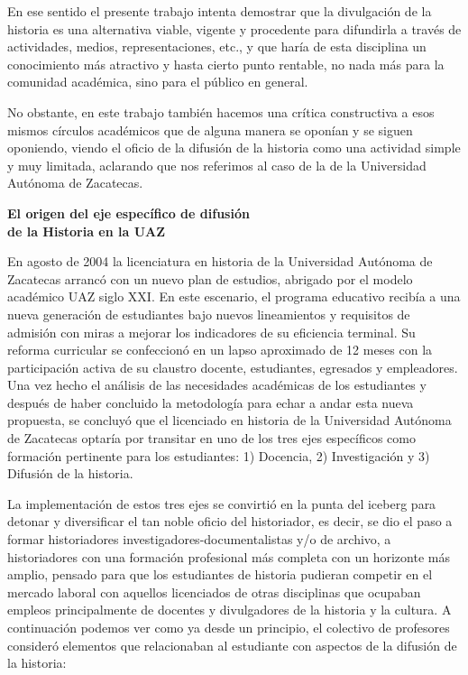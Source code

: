 En ese sentido el presente trabajo intenta demostrar que la divulgación de la
historia es una alternativa viable, vigente y procedente para difundirla a
través de actividades, medios, representaciones, etc., y que haría de esta
disciplina un conocimiento más atractivo y hasta cierto punto rentable, no
nada más para la comunidad académica, sino para el público en general.


No obstante, en este trabajo también hacemos una crítica constructiva a esos
mismos círculos académicos que de alguna manera se oponían y se siguen
oponiendo, viendo el oficio de la difusión de la historia como una actividad
simple y muy limitada, aclarando que nos referimos al caso de la  de la
Universidad Autónoma de Zacatecas.


\bigskip
\textbf{El origen del eje específico de difusión\\ de la Historia en la UAZ}

En agosto de 2004 la licenciatura en historia de la Universidad Autónoma de
Zacatecas arrancó con un nuevo plan de estudios, abrigado por el modelo
académico UAZ siglo XXI\@. En este escenario, el programa educativo recibía a una nueva generación de estudiantes bajo nuevos lineamientos y requisitos de
admisión con miras a mejorar los indicadores de su eficiencia terminal. Su
reforma curricular se confeccionó en un lapso aproximado de 12 meses con la
participación activa de su claustro docente, estudiantes, egresados y
empleadores. Una vez hecho el análisis de las necesidades académicas de los
estudiantes y después de haber concluido la metodología para echar a andar esta
nueva propuesta, se concluyó que el licenciado en historia de la Universidad
Autónoma de Zacatecas optaría por transitar en uno de los tres ejes específicos
como formación pertinente para los estudiantes: 1) Docencia, 2) Investigación y
3) Difusión de la historia. 

La implementación de estos tres ejes se convirtió en la punta del iceberg
para detonar y diversificar el tan noble oficio del historiador, es decir, se
dio el paso a formar historiadores in\-ves\-ti\-ga\-do\-res-do\-cu\-men\-ta\-lis\-tas y\slash{}o de archivo, a historiadores con una formación profesional más completa con un
horizonte más amplio, pensado para que los estudiantes de historia pudieran
competir en el mercado laboral con aquellos licenciados de otras disciplinas
que ocupaban empleos principalmente de docentes y divulgadores de la historia y
la cultura. A continuación podemos ver como ya desde un principio, el colectivo
de profesores consideró elementos que relacionaban al estudiante con aspectos
de la difusión de la historia:


